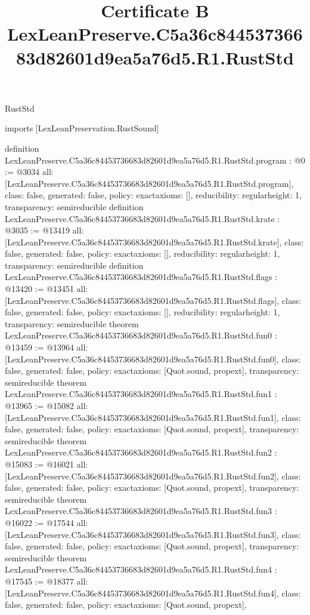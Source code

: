 \begin{lexlean}{RustStd}
\title{Certificate B LexLeanPreserve.C5a36c84453736683d82601d9ea5a76d5.R1.RustStd}
\begin{coremodule}
imports [LexLeanPreservation.RustSound]

definition LexLeanPreserve.C5a36c84453736683d82601d9ea5a76d5.R1.RustStd.program : @0 := @3034 {
  all: [LexLeanPreserve.C5a36c84453736683d82601d9ea5a76d5.R1.RustStd.program],
  class: false,
  generated: false,
  policy: exact{axioms: []},
  reducibility: regular{height: 1},
  transparency: semireducible
}
definition LexLeanPreserve.C5a36c84453736683d82601d9ea5a76d5.R1.RustStd.krate : @3035 := @13419 {
  all: [LexLeanPreserve.C5a36c84453736683d82601d9ea5a76d5.R1.RustStd.krate],
  class: false,
  generated: false,
  policy: exact{axioms: []},
  reducibility: regular{height: 1},
  transparency: semireducible
}
definition LexLeanPreserve.C5a36c84453736683d82601d9ea5a76d5.R1.RustStd.flags : @13420 := @13451 {
  all: [LexLeanPreserve.C5a36c84453736683d82601d9ea5a76d5.R1.RustStd.flags],
  class: false,
  generated: false,
  policy: exact{axioms: []},
  reducibility: regular{height: 1},
  transparency: semireducible
}
theorem LexLeanPreserve.C5a36c84453736683d82601d9ea5a76d5.R1.RustStd.fun0 : @13459 := @13964 {
  all: [LexLeanPreserve.C5a36c84453736683d82601d9ea5a76d5.R1.RustStd.fun0],
  class: false,
  generated: false,
  policy: exact{axioms: [Quot.sound, propext]},
  transparency: semireducible
}
theorem LexLeanPreserve.C5a36c84453736683d82601d9ea5a76d5.R1.RustStd.fun1 : @13965 := @15082 {
  all: [LexLeanPreserve.C5a36c84453736683d82601d9ea5a76d5.R1.RustStd.fun1],
  class: false,
  generated: false,
  policy: exact{axioms: [Quot.sound, propext]},
  transparency: semireducible
}
theorem LexLeanPreserve.C5a36c84453736683d82601d9ea5a76d5.R1.RustStd.fun2 : @15083 := @16021 {
  all: [LexLeanPreserve.C5a36c84453736683d82601d9ea5a76d5.R1.RustStd.fun2],
  class: false,
  generated: false,
  policy: exact{axioms: [Quot.sound, propext]},
  transparency: semireducible
}
theorem LexLeanPreserve.C5a36c84453736683d82601d9ea5a76d5.R1.RustStd.fun3 : @16022 := @17544 {
  all: [LexLeanPreserve.C5a36c84453736683d82601d9ea5a76d5.R1.RustStd.fun3],
  class: false,
  generated: false,
  policy: exact{axioms: [Quot.sound, propext]},
  transparency: semireducible
}
theorem LexLeanPreserve.C5a36c84453736683d82601d9ea5a76d5.R1.RustStd.fun4 : @17545 := @18377 {
  all: [LexLeanPreserve.C5a36c84453736683d82601d9ea5a76d5.R1.RustStd.fun4],
  class: false,
  generated: false,
  policy: exact{axioms: [Quot.sound, propext]},
}
\end{coremodule}
\end{lexlean}

